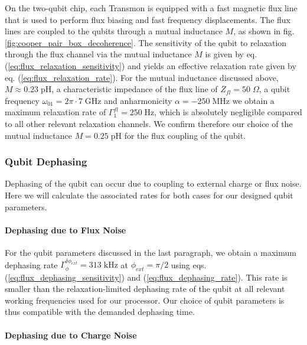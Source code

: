 On the two-qubit chip, each Transmon is equipped with a fast magnetic flux line that is used to perform flux biasing and fast frequency displacements. The flux lines are coupled to the qubits through a mutual inductance $M$, as shown in fig. \ref{fig:cooper_pair_box_decoherence}. The sensitivity of the qubit to relaxation through the flux channel via the mutual inductance $M$ is given by eq. (\ref{eq:flux_relaxation_sensitivity}) and yields an effective relaxation rate given by eq. (\ref{eq:flux_relaxation_rate}). For the mutual inductance discussed above, $M \approx 0.23\;\mathrm{pH}$, a characteristic impedance of the flux line of $Z_{fl}=50\;\Omega$, a qubit frequency $\omega_{01}=2\pi \cdot 7 \;\mathrm{GHz}$ and anharmonicity $\alpha=-250\;\mathrm{MHz}$ we obtain a maximum relaxation rate of $\Gamma_1^{fl}=250\;\mathrm{Hz}$, which is absolutely negligible compared to all other relevant relaxation channels. We confirm therefore our choice of the mutual inductance $M=0.25\;\mathrm{pH}$ for the flux coupling of the qubit. 

\subsubsection{Qubit Dephasing}

Dephasing of the qubit can occur due to coupling to external charge or flux noise. Here we will calculate the associated rates for both cases for our designed qubit parameters.

\paragraph{Dephasing due to Flux Noise}

For the qubit parameters discussed in the last paragraph, we obtain a maximum dephasing rate $\Gamma_\phi^{\delta \phi_{ext}}=313\;\mathrm{kHz}$ at $\phi_{ext}=\pi/2$ using eqs. (\ref{eq:flux_dephasing_sensitivity}) and (\ref{eq:flux_dephasing_rate}). This rate is smaller than the relaxation-limited dephasing rate of the qubit at all relevant working frequencies used for our processor. Our choice of qubit parameters is thus compatible with the demanded dephasing time.

\paragraph{Dephasing due to Charge Noise}

